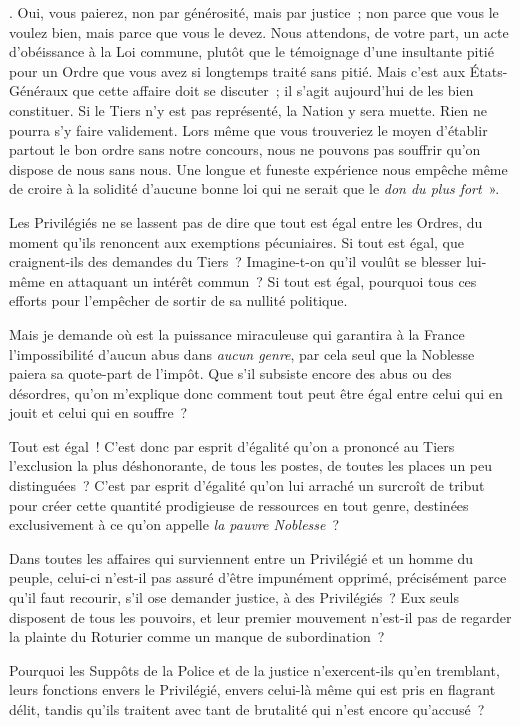 \documentclass[french,twoside]{book} %
\begin{document}
{}. Oui, vous paierez, non par générosité, mais par justice ; non parce que vous le voulez bien, mais parce que vous le devez. Nous attendons, de votre part, un acte d’obéissance à la Loi commune, plutôt que le témoignage d’une insultante pitié pour un Ordre que vous avez si longtemps traité sans pitié. Mais c’est aux États-Généraux que cette affaire doit se discuter ; il s’agit aujourd’hui de les bien constituer. Si le Tiers n’y est pas représenté, la Nation y sera muette. Rien ne pourra s’y faire validement. Lors même que vous trouveriez le moyen d’établir partout le bon ordre sans notre concours, nous ne pouvons pas souffrir qu’on dispose de nous sans nous. Une longue et funeste expérience nous empêche même de croire à la solidité d’aucune bonne loi qui ne serait que le {\itshape don du plus fort} ».\par
Les Privilégiés ne se lassent pas de dire que tout est égal entre les Ordres, du moment qu’ils renoncent aux exemptions pécuniaires. Si tout est égal, que craignent-ils des demandes du Tiers ? Imagine-t-on qu’il voulût se blesser lui-même en attaquant un intérêt commun ? Si tout est égal, pourquoi tous ces efforts pour l’empêcher de sortir de sa nullité politique.\par
Mais je demande où est la puissance miraculeuse qui garantira à la France l’impossibilité d’aucun abus dans {\itshape aucun genre}, par cela seul que la Noblesse paiera sa quote-part de l’impôt. Que s’il subsiste encore des abus ou des désordres, qu’on m’explique donc comment tout peut être égal entre celui qui en jouit et celui qui en souffre ?\par
Tout est égal ! C’est donc par esprit d’égalité qu’on a prononcé au Tiers l’exclusion la plus déshonorante, de tous les postes, de toutes les places un peu distinguées ? C’est par esprit d’égalité qu’on lui arraché un surcroît de tribut pour créer cette quantité prodigieuse de ressources en tout genre, destinées exclusivement à ce qu’on appelle {\itshape la pauvre Noblesse} ?\par
Dans toutes les affaires qui surviennent entre un Privilégié et un homme du peuple, celui-ci n’est-il pas assuré d’être impunément opprimé, précisément parce qu’il faut recourir, s’il ose demander justice, à des Privilégiés ? Eux seuls disposent de tous les pouvoirs, et leur premier mouvement n’est-il pas de regarder la plainte du Roturier comme un manque de subordination ?\par
Pourquoi les Suppôts de la Police et de la justice n’exercent-ils qu’en tremblant, leurs fonctions envers le Privilégié, envers celui-là même qui est pris en flagrant délit, tandis qu’ils traitent avec tant de brutalité qui n’est encore qu’accusé ?\par
\end{document}
